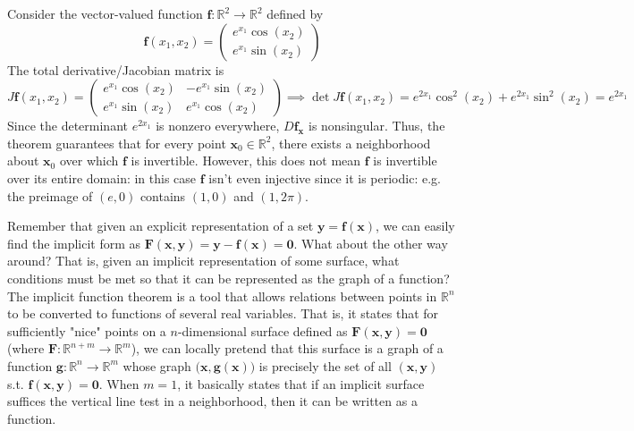   \begin{example}
  Consider the vector-valued function $\mathbf{f}: \mathbb{R}^2 \longrightarrow \mathbb{R}^2$ defined by 
  \[\mathbf{f}(x_1, x_2) = \begin{pmatrix}
  e^{x_1}\cos (x_2) \\ e^{x_1} \sin(x_2)
  \end{pmatrix}\]
  The total derivative/Jacobian matrix is 
  \[J \mathbf{f}(x_1, x_2) = \begin{pmatrix}
  e^{x_1} \cos(x_2) & - e^{x_1} \sin(x_2) \\
  e^{x_1} \sin(x_2) & e^{x_1} \cos(x_2)
  \end{pmatrix} \implies \det J \mathbf{f}(x_1, x_2) = e^{2x_1} \cos^2 (x_2) + e^{2x_1} \sin^2 (x_2) = e^{2x_1}\]
  Since the determinant $e^{2x_1}$ is nonzero everywhere, $D \mathbf{f}_\mathbf{x}$ is nonsingular. Thus, the theorem guarantees that for every point $\mathbf{x}_0 \in \mathbb{R}^2$, there exists a neighborhood about $\mathbf{x}_0$ over which $\mathbf{f}$ is invertible. However, this does not mean $\mathbf{f}$ is invertible over its entire domain: in this case $\mathbf{f}$ isn't even injective since it is periodic: e.g. the preimage of $(e, 0)$ contains $(1, 0)$ and $(1, 2\pi)$. 
  \end{example}

  Remember that given an explicit representation of a set $\mathbf{y} = \mathbf{f}(\mathbf{x})$, we can easily find the implicit form as $\mathbf{F}(\mathbf{x}, \mathbf{y}) = \mathbf{y} - \mathbf{f}(\mathbf{x}) = \mathbf{0}$. What about the other way around? That is, given an implicit representation of some surface, what conditions must be met so that it can be represented as the graph of a function? The implicit function theorem is a tool that allows relations between points in $\mathbb{R}^n$ to be converted to functions of several real variables. That is, it states that for sufficiently "nice" points on a $n$-dimensional surface defined as $\mathbf{F}(\mathbf{x}, \mathbf{y}) = \mathbf{0}$ (where $\mathbf{F}: \mathbb{R}^{n+m} \longrightarrow \mathbb{R}^m$), we can locally pretend that this surface is a graph of a function $\mathbf{g}: \mathbb{R}^n \longrightarrow \mathbb{R}^m$ whose graph $\big(\mathbf{x}, \mathbf{g}(\mathbf{x})\big)$ is precisely the set of all $(\mathbf{x}, \mathbf{y})$ s.t. $\mathbf{f}(\mathbf{x}, \mathbf{y}) = \mathbf{0}$. When $m = 1$, it basically states that if an implicit surface suffices the vertical line test in a neighborhood, then it can be written as a function. 

